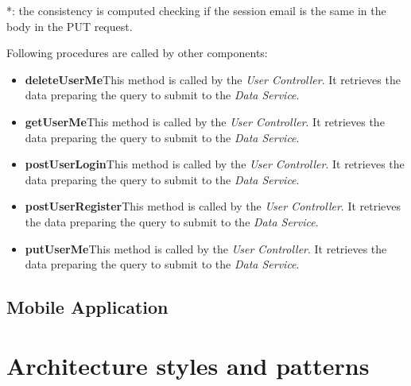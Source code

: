 *: the consistency is computed checking if the session email is the same in the body in the PUT request.

Following procedures are called by other components:
\begin{itemize}
    \item \textbf{deleteUserMe}\quad This method is called by the \textit{User Controller}. It retrieves the data preparing the query to submit to the \textit{Data Service}.
    \item \textbf{getUserMe}\quad This method is called by the \textit{User Controller}. It retrieves the data preparing the query to submit to the \textit{Data Service}.
    \item \textbf{postUserLogin}\quad This method is called by the \textit{User Controller}. It retrieves the data preparing the query to submit to the \textit{Data Service}.
    \item \textbf{postUserRegister}\quad This method is called by the \textit{User Controller}. It retrieves the data preparing the query to submit to the \textit{Data Service}.
    \item \textbf{putUserMe}\quad This method is called by the \textit{User Controller}. It retrieves the data preparing the query to submit to the \textit{Data Service}.
\end{itemize}

\subsection{Mobile Application}\label{sec:ci_mobile}


\section{Architecture styles and patterns}